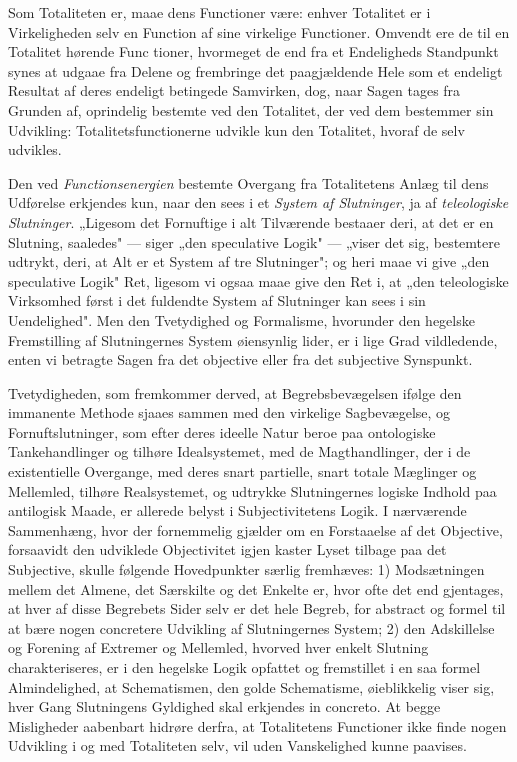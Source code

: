 \documentclass[12pt]{book}
\newcommand{\opage}[1]{\marginnote{\footnotesize\textit{[#1]}}}
\newcommand{\apage}[1]{\marginnote{\footnotesize\textit{[#1]}}}
\begin{document}
Som Totaliteten er, maae dens Functioner være: enhver Totalitet er i Virkeligheden selv en Function
af sine virkelige Functioner. Omvendt ere de til en Totalitet hørende \apage{429} Func\-%
tioner, hvormeget de end fra et Endeligheds Standpunkt synes at udgaae fra Delene og frembringe det
paagjældende Hele som et endeligt Resultat af deres endeligt betingede Samvirken, dog, naar Sagen
tages fra Grunden af, oprindelig bestemte ved den Totalitet, der ved dem bestemmer sin Udvikling:
Totalitetsfunctionerne udvikle kun den Totalitet, hvoraf de selv udvikles.

Den ved \emph{Functionsenergien} bestemte Overgang fra Totalitetens Anlæg til dens Udførelse
erkjendes kun, naar den sees i et \emph{System af Slutninger}, ja af \emph{teleologiske Slutninger}.
„Ligesom det Fornuftige i alt Tilværende bestaaer deri, at det er en Slutning, saaledes" — siger „den
speculative Logik" — „viser det sig, bestemtere udtrykt, deri, at Alt er et System af tre
Slutninger"; og heri maae vi give „den speculative Logik" Ret, ligesom vi ogsaa maae give den Ret i,
at „den teleologiske Virksomhed først i det fuldendte System af Slutninger kan sees i sin
Uendelighed". Men den Tvetydighed og Formalisme, hvorunder den hegelske Fremstilling af Slutningernes
System øiensynlig lider, er i lige Grad vildledende, enten vi betragte Sagen fra det objective eller
fra det subjective Synspunkt.

Tvetydigheden, som fremkommer derved, at Begrebsbevægelsen ifølge den immanente Methode sjaaes sammen
med den virkelige Sagbevægelse, og Fornuftslutninger, som efter deres ideelle Natur beroe paa
ontologiske Tankehandlinger og tilhøre Idealsystemet, med de Magthandlinger, der i de existentielle
Overgange, med deres snart partielle, snart totale Mæglinger og Mellemled, tilhøre Realsystemet, og
udtrykke Slutningernes logiske Indhold paa antilogisk Maade, er allerede belyst i Subjectivitetens
Logik. I nærværende Sammenhæng, hvor der fornemmelig gjælder om en Forstaaelse af det Objective,
forsaavidt den udviklede Objectivitet igjen kaster Lyset tilbage paa det Subjective, skulle følgende
Hovedpunkter særlig fremhæves: 1) Modsætningen mellem det Almene, det
\opage{430} Særskilte og det Enkelte er, hvor ofte det end gjentages, at hver af disse Begrebets Sider selv er
det hele Begreb, for abstract og formel til at bære nogen concretere Udvikling af Slutningernes
System; 2) den Adskillelse og Forening af Extremer og Mellemled, hvorved hver enkelt Slutning
charakteriseres, er i den hegelske Logik opfattet og fremstillet i en saa formel Almindelighed, at
Schematismen, den golde Schematisme, øieblikkelig viser sig, hver Gang Slutningens Gyldighed skal
erkjendes in concreto. At begge Misligheder aabenbart hidrøre derfra, at Totalitetens Functioner ikke
finde nogen Udvikling i og med Totaliteten selv, vil uden Vanskelighed kunne paavises.
\end{document}
